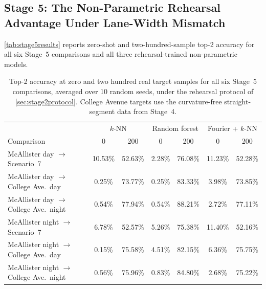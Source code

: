 \documentclass{iutbscthesis}
\begin{document}
\subsection{Stage 5: The Non-Parametric Rehearsal Advantage Under Lane-Width Mismatch}
\label{sec:stage5results}

\autoref{tab:stage5results} reports zero-shot and two-hundred-sample top-2 accuracy for all six Stage~5 comparisons and all three rehearsal-trained non-parametric models.

\begin{table}[H]
    \centering
    \begin{tabular}{l c c c c c c}
        \toprule
        & \multicolumn{2}{c}{$k$-NN} & \multicolumn{2}{c}{Random forest} & \multicolumn{2}{c}{Fourier + $k$-NN} \\
        Comparison & 0 & 200 & 0 & 200 & 0 & 200 \\
        \midrule
        McAllister day $\to$ Scenario~7            & 10.53\% & 52.63\% & 2.28\% & 76.08\% & 11.23\% & 52.28\% \\
        McAllister day $\to$ College Ave.\ day     & 0.25\%  & 73.77\% & 0.25\% & 83.33\% & 3.98\%  & 73.85\% \\
        McAllister day $\to$ College Ave.\ night   & 0.54\%  & 77.94\% & 0.54\% & 88.21\% & 2.72\%  & 77.11\% \\
        McAllister night $\to$ Scenario~7          & 6.78\%  & 52.57\% & 5.26\% & 75.38\% & 11.40\% & 52.16\% \\
        McAllister night $\to$ College Ave.\ day   & 0.15\%  & 75.58\% & 4.51\% & 82.15\% & 6.36\%  & 75.75\% \\
        McAllister night $\to$ College Ave.\ night & 0.56\%  & 75.96\% & 0.83\% & 84.80\% & 2.68\%  & 75.22\% \\
        \bottomrule
    \end{tabular}
    \caption{Top-2 accuracy at zero and two hundred real target samples for all six Stage~5 comparisons, averaged over 10 random seeds, under the rehearsal protocol of \autoref{sec:stage2protocol}. College Avenue targets use the curvature-free straight-segment data from Stage~4.}
    \label{tab:stage5results}
\end{table}
\end{document}
